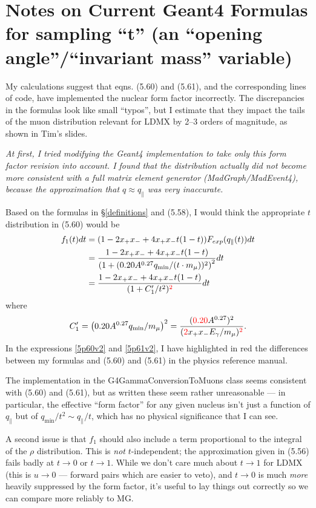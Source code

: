 \documentclass[11pt]{article}
\newcommand{\be}{\begin{equation}}
\newcommand{\ee}{\end{equation}}
\newcommand{\pal}{\parallel}
\newcommand{\red}{\color[rgb]{1,0,0}}
\begin{document}
\appendix
\section{Notes on Current Geant4 Formulas for sampling ``t'' (an ``opening angle''/``invariant mass'' variable)}
My calculations suggest that eqns. (5.60) and (5.61), and the corresponding lines of code, have implemented the nuclear form factor incorrectly.  The discrepancies in the formulas look like small ``typos'', but I estimate that they impact the tails of the muon distribution relevant for LDMX by 2--3 orders of magnitude, as shown in Tim's slides.

\emph{At first, I tried modifying the Geant4 implementation to take only this form factor revision into account.  I found that the distribution actually did \emph{not} become more consistent with a full matrix element generator (MadGraph/MadEvent4), because the approximation that $q \approx q_\parallel$ was very inaccurate. }

Based on the formulas in \S\ref{definitions} and (5.58), I would think the appropriate $t$ distribution in (5.60) would be
\begin{eqnarray}
f_1(t) dt & = (1 - 2 x_+ x_- + 4 x_+ x_- t (1-t)) F_{exp}(q_\pal(t)) dt\nonumber \\
& = \frac{1 - 2 x_+ x_- + 4 x_+ x_- t (1-t)}{\left(1 + (0.20 A^{0.27} {q_{\min}}/(t \cdot m_\mu) )^2\right)^{2}}  dt\nonumber \\
& = \frac{1 - 2 x_+ x_- + 4 x_+ x_- t (1-t)}{(1 + C_1'/t^2)^{\red 2}}  dt \label{5p60v2}
\end{eqnarray}
where
\be
C_1' = \left(0.20 A^{0.27} q_{\min}/m_\mu\right)^2 = \frac{({\red 0.20} A^{0.27})^2}{({\red 2} x_+ x_- E_\gamma/{m_\mu})^{\red 2}}. \label{5p61v2}
\ee
In the expressions \eqref{5p60v2} and \eqref{5p61v2}, I have highlighted in red the differences between my formulas and (5.60) and (5.61) in the physics reference manual.  

The implementation in the G4GammaConversionToMuons class seems consistent with (5.60) and (5.61), but as written these seem rather unreasonable --- in particular, the effective ``form factor'' for any given nucleus isn't just a function of $q_\pal$ but of $q_{\min}/t^2 \sim q_\pal/t$, which has no physical significance that I can see. 

A second issue is that $f_1$ should also include a term proportional to the integral of the $\rho$ distribution.  This is \emph{not} $t$-independent; the approximation given in (5.56) fails badly at $t\rightarrow 0$ or $t\rightarrow 1$.  While we don't care much about $t\rightarrow 1$ for LDMX (this is $u\rightarrow 0$ --- forward pairs which are easier to veto), and $t\rightarrow 0$ is much \emph{more} heavily suppressed by the form factor, it's useful to lay things out correctly so we can compare more reliably to MG.
\end{document}
